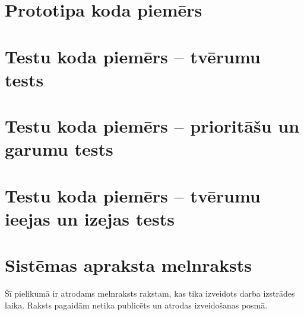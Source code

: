 \documentclass[12pt, a4paper]{article}
\begin{document}
\begin{appendices}

\newcommand{\ap}[1]{\section{#1}}
\renewcommand\thesection{\arabic{section} }

\ap{Prototipa koda piemērs}
\label{ap:code_sample}



\ap{Testu koda piemērs -- tvērumu tests}
\label{ap:test1_sample}



\ap{Testu koda piemērs -- prioritāšu un garumu tests}
\label{ap:test2_sample}



\ap{Testu koda piemērs -- tvērumu ieejas un izejas tests}
\label{ap:test3_sample}



\ap{Sistēmas apraksta melnraksts}
\label{ap:draft}

Šī pielikumā ir atrodams melnraksts rakstam, kas tika izveidots darba izstrādes laika. Raksts pagaidām netika publicēts un atrodas izveidošanas posmā.



\end{appendices}

{}


\reglapa
\end{document}
